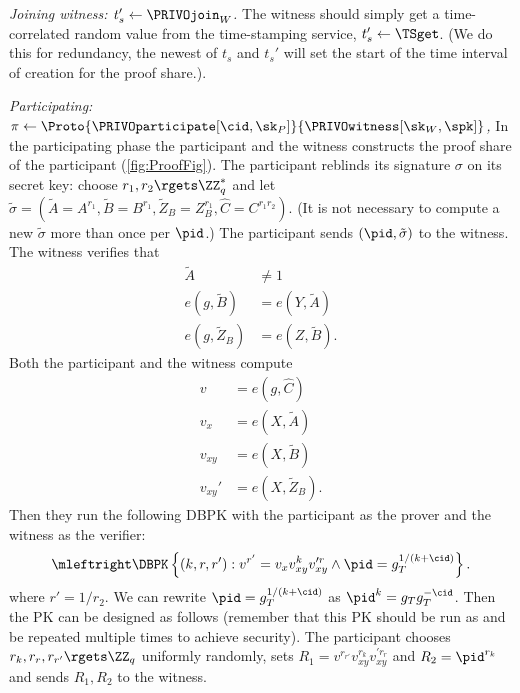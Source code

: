 \emph{Joining witness: \(t_s'\gets \PRIVOjoin_W\).}
The witness should simply get a time-correlated random value from the 
time-stamping service, \(t_s'\gets \TSget\).
(We do this for redundancy, the newest of \(t_s\) and \(t_s'\) will set the 
start of the time interval of creation for the proof share.).


\emph{Participating: \(\pi\gets
    \Proto{\PRIVOparticipate[\cid, \sk_P]}{\PRIVOwitness[\sk_W, \spk]}\),}
In the participating phase the participant and the witness constructs the proof 
share of the participant (\cref{fig:ProofFig}).
The participant reblinds its signature \(\sigma\) on its secret key: choose 
\(r_1, r_2\rgets \ZZ_q^*\) and let \(
  \tilde\sigma = (\tilde A = A^{r_1},
                  \tilde B = B^{r_1},
                  \tilde Z_B = Z_B^{r_1},
                  \hat C = C^{r_1 r_2}).
\) (It is not necessary to compute a new \(\tilde\sigma\) more than once per 
\(\pid\).)
The participant sends \((\pid, \tilde\sigma)\) to the witness.
The witness verifies that
\begin{align*}
  \tilde A          &\neq 1 \\
  e(g, \tilde B)    &= e(Y, \tilde A) \\
  e(g, \tilde Z_B)  &= e(Z, \tilde B).
\end{align*}
Both the participant and the witness compute
\begin{align*}
  v &= e(g, \hat C) \\
  v_x &= e(X, \tilde A) \\
  v_{xy} &= e(X, \tilde B) \\
  v_{xy}' &= e(X, \tilde Z_B).
\end{align*}
Then they run the following \ac{DBPK} with the participant as the prover and the 
witness as the verifier:
\begin{multline*}
  \mleftright
  \DBPK\left\{(k, r, r') : v^{r'} = v_x v_{xy}^k v_{xy}^{\prime r} \land
    \pid = g_T^{1/(k+\cid)} \right\}.
\end{multline*}
where \(r' = 1/r_2\).
We can rewrite \(\pid = g_T^{1/(k+\cid)}\) as \(\pid^k = g_T g_T^{-\cid}\).
Then the \ac{PK} can be designed as follows (remember that this \ac{PK} should 
be run as  and be repeated multiple times to achieve security).
The participant chooses \(r_k, r_r, r_{r'}\rgets \ZZ_q\) uniformly randomly, 
sets \(R_1 = v^{r_{r'}} v_{xy}^{r_k} v_{xy}^{\prime r_r}\) and \(R_2 = 
  \pid^{r_k}\) and sends \(R_1, R_2\) to the witness.
